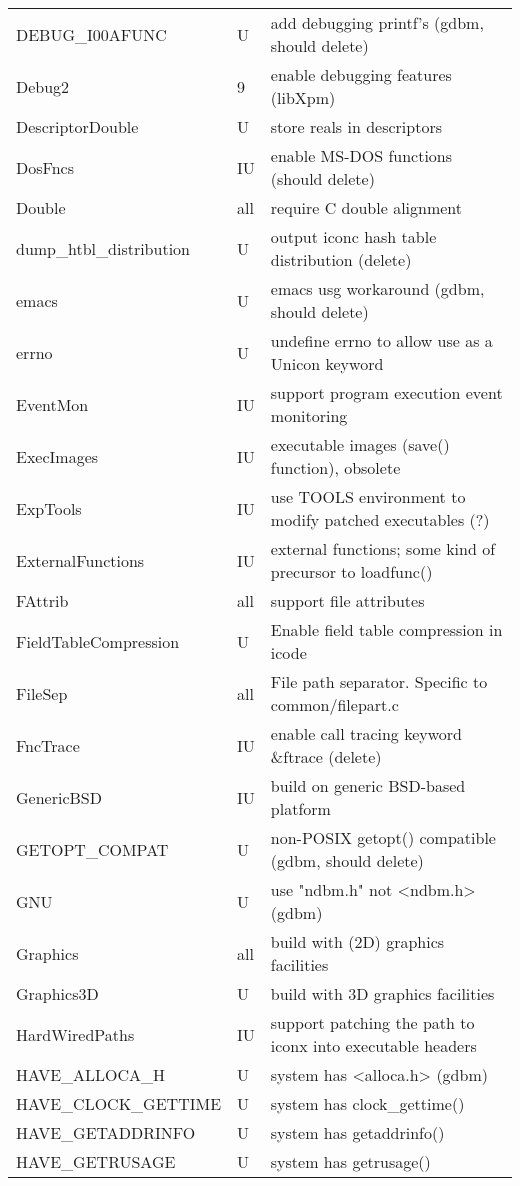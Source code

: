 \begin{xtabular}{|m{1.8in}|m{0.5in}|m{4.0in}|}
DEBUG\_I00AFUNC & U & add debugging printf's (gdbm, should delete) \\
Debug2 & 9 & enable debugging features (libXpm) \\
DescriptorDouble & U & store reals in descriptors \\
DosFncs & IU & enable MS-DOS functions (should delete) \\
Double & all & require C double alignment \\
dump\_htbl\_distribution & U & output iconc hash table distribution (delete) \\
emacs & U & emacs usg workaround (gdbm, should delete) \\
errno & U & undefine errno to allow use as a Unicon keyword \\
EventMon & IU & support program execution event monitoring \\
ExecImages & IU & executable images (save() function), obsolete \\
ExpTools & IU & use TOOLS environment to modify patched executables (?) \\
ExternalFunctions & IU & external functions; some kind of precursor to loadfunc() \\
FAttrib & all & support file attributes \\
FieldTableCompression & U & Enable field table compression in icode \\
FileSep & all & File path separator. Specific to common/filepart.c \\
FncTrace & IU & enable call tracing keyword \&ftrace (delete) \\
GenericBSD & IU & build on generic BSD-based platform \\
GETOPT\_COMPAT & U & non-POSIX getopt() compatible (gdbm, should delete) \\
GNU & U & use "ndbm.h" not <ndbm.h> (gdbm) \\
Graphics & all & build with (2D) graphics facilities \\
Graphics3D & U & build with 3D graphics facilities \\
HardWiredPaths & IU & support patching the path to iconx into executable headers \\
HAVE\_ALLOCA\_H & U & system has <alloca.h> (gdbm) \\
HAVE\_CLOCK\_GETTIME & U & system has clock\_gettime() \\
HAVE\_GETADDRINFO & U & system has getaddrinfo() \\
HAVE\_GETRUSAGE & U & system has getrusage() \\

\end{xtabular}

